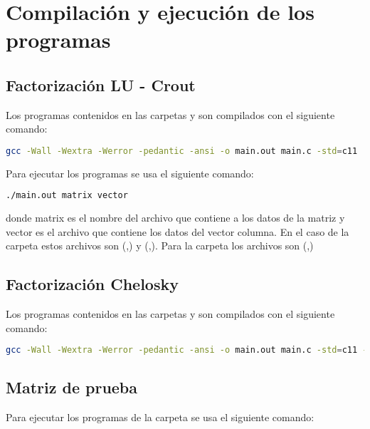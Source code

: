\section{Compilación y ejecución de los programas}

\subsection{Factorización LU - Crout}

Los programas contenidos en las carpetas  y  son compilados con el siguiente comando:

\begin{lstlisting}[language=bash]
    gcc -Wall -Wextra -Werror -pedantic -ansi -o main.out main.c -std=c11
\end{lstlisting}

Para ejecutar los programas se usa el siguiente comando:

\begin{lstlisting}[language=bash]
    ./main.out matrix vector 
\end{lstlisting}

donde matrix es el nombre del archivo que contiene a los datos de la matriz y vector es el archivo que contiene los datos del vector columna. En el caso de la carpeta  estos archivos son (,) y (,). Para la carpeta  los archivos son (,)

\subsection{Factorización Chelosky}

Los programas contenidos en las carpetas  y  son compilados con el siguiente comando:
\begin{lstlisting}[language=bash]
    gcc -Wall -Wextra -Werror -pedantic -ansi -o main.out main.c -std=c11 -lm
\end{lstlisting}

\subsection{Matriz de prueba}

Para ejecutar los programas de la carpeta  se usa el siguiente comando:

